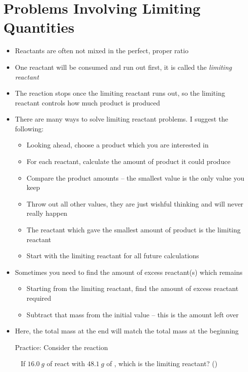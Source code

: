 \documentclass[12pt, openany, letterpaper]{memoir}
\begin{document}
\section{Problems Involving Limiting Quantities}
\begin{itemize}
	\item Reactants are often not mixed in the perfect, proper ratio
	\item One reactant will be consumed and run out first, it is called the \emph{limiting reactant}
	\item The reaction stops once the limiting reactant runs out, so the limiting reactant controls how much product is produced
	\item There are many ways to solve limiting reactant problems. I suggest the following:
	\begin{itemize}
		\item Looking ahead, choose a product which you are interested in
		\item For each reactant, calculate the amount of product it could produce
		\item Compare the product amounts -- the smallest value is the only value you keep
		\item Throw out all other values, they are just wishful thinking and will never really happen
		\item The reactant which gave the smallest amount of product is the limiting reactant
		\item Start with the limiting reactant for all future calculations
	\end{itemize} 
	\item Sometimes you need to find the amount of excess reactant(s) which remains
	\begin{itemize}
		\item Starting from the limiting reactant, find the amount of excess reactant required
		\item Subtract that mass from the initial value -- this is the amount left over
	\end{itemize}
	\item Here, the total mass at the end will match the total mass at the beginning
	
	Practice: Consider the reaction 
	
	~\hphantom{Practice:} If $16.0~g$ of  react with $48.1~g$ of , which is the limiting reactant? \hspace{1em} ()
	

\end{itemize}
\end{document}
